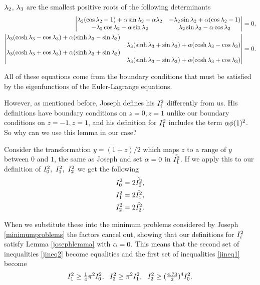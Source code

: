 $ \lambda_2$, $ \lambda_3$ are the smallest positive roots of the following determinants
\begin{align}
    \begin{vmatrix}
        \lambda_2 (\cos \lambda_2 - 1) + \alpha \sin \lambda_2 - \alpha \lambda_2 & - \lambda_2 \sin \lambda_2 + \alpha (\cos \lambda_2 - 1) \\
        -\lambda_2 \cos \lambda_2 - \alpha \sin \lambda_2 & \lambda_2 \sin \lambda_2 - \alpha \cos \lambda_2
    \end{vmatrix} &= 0, \\
    \begin{vmatrix}
        \lambda_3 ( \cosh \lambda_3 - \cos \lambda_3 ) + \alpha ( \sinh \lambda_3 - \sin \lambda_3) & \\
         & \lambda_3 ( \sinh \lambda_3 + \sin \lambda_3 ) + \alpha ( \cosh \lambda_3 - \cos \lambda_3) \\
        \lambda_3 ( \cosh \lambda_3 + \cos \lambda_3 ) + \alpha ( \sinh \lambda_3 + \sin \lambda_3) & \\ & \lambda_3 ( \sinh \lambda_3 - \sin \lambda_3 ) + \alpha ( \cosh \lambda_3 + \cos \lambda_3)
    \end{vmatrix} &= 0.
\end{align}

All of these equations come from the boundary conditions that must be satisfied by the eigenfunctions of the Euler-Lagrange equations. 

However, as mentioned before, Joseph defines his $ I^2_{i} $ differently from us. His definitions have boundary conditions on $ z = 0, z = 1$ unlike our boundary conditions on $ z = -1, z = 1$, and his definition for $ I^2_{1}$ includes the term $ \alpha \phi(1)^2$. So why can we use this lemma in our case? 

Consider the transformation $ y = (1 + z) / 2$ which maps $ z $ to a range of $ y $ between $ 0 $ and $ 1$, the same as Joseph and set $ \alpha = 0 $ in $ \Tilde{I^2_{1}}$. If we apply this to our definition of $ \I{0},\ \I{1},\ \I{2} $ we get the following
\begin{align}
    I^2_{0} &= 2 \Tilde{I^2_{0}}, \\
    I^2_{1} &= 2 \Tilde{I^2_{1}}, \\
    I^2_{2} &= 2 \Tilde{I^2_{2}}.
\end{align}

When we substitute these into the minimum problems considered by Joseph \eqref{minimumproblems} the factors cancel out, showing that our definitions for $ I^2_{i}$ satisfy Lemma \ref{josephlemma} with $ \alpha = 0$. This means that the second set of inequalities \eqref{jineq2} become equalities and the first set of inequalities \eqref{jineq1} become
\begin{equation}
    I^2_{1} \geq \tfrac{1}{4} \pi^2 I^2_{0} ,\ \ I^2_{2} \geq \pi^2 I^2_{1},\ \ I^2_{2} \geq (\tfrac{4.73}{2})^4 I^2_{0}.
    \label{lamineq}
\end{equation}

